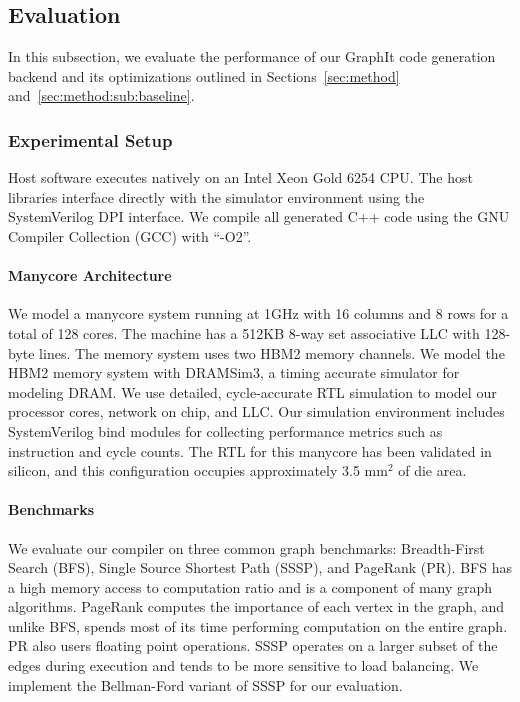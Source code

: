 

\subsection{Evaluation} \label{sec:eval}
In this subsection, we evaluate the performance of our GraphIt code generation backend and its optimizations outlined in Sections~\ref{sec:method} and~\ref{sec:method:sub:baseline}.

\subsubsection{Experimental Setup}

\graphInfoTable

Host software executes natively on an Intel Xeon Gold 6254 CPU.
The host libraries interface directly with the simulator environment using the SystemVerilog DPI interface.
We compile all generated C++ code using the GNU Compiler Collection (GCC) with ``-O2''.

\paragraph{Manycore Architecture}
We model a manycore system running at 1GHz with 16 columns and 8 rows for a total of 128 cores.
The machine has a 512KB 8-way set associative LLC with 128-byte lines.
The memory system uses two HBM2 memory channels.
We model the HBM2 memory system with DRAMSim3\cite{li2019dramsim3},  a timing accurate simulator for modeling DRAM.
We use detailed, cycle-accurate RTL simulation to model our processor cores, network on chip, and LLC.
Our simulation environment includes SystemVerilog bind modules for collecting performance metrics such as instruction and cycle counts.
The RTL for this manycore has been validated in silicon, and this configuration occupies approximately 3.5 mm$^2$ of die area. 

\paragraph{Benchmarks} We evaluate our compiler on three common graph benchmarks: Breadth-First Search (BFS), Single Source Shortest Path (SSSP), and PageRank (PR). 
BFS has a high memory access to computation ratio and is a component of many graph algorithms.
PageRank computes the importance of each vertex in the graph, and unlike BFS, spends most of its time performing computation on the entire graph.
PR also users floating point operations.
SSSP operates on a larger subset of the edges during execution and tends to be more sensitive to load balancing.
We implement the Bellman-Ford variant of SSSP for our evaluation.

